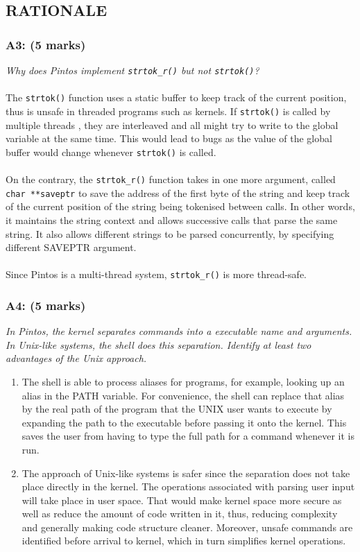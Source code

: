 \documentclass{article}
\begin{document}
\subsection{RATIONALE}

\subsubsection*{A3: (5 marks) }
\textit{Why does Pintos implement \texttt{strtok\_r()} but not \texttt{strtok()}?}
\\ \\
The \texttt{strtok()} function uses a static buffer to keep track of the current position, thus is unsafe in threaded programs such as kernels. If \texttt{strtok()} is called by multiple threads ,  they are interleaved and all might try to write to the global variable at the same time. This would lead to bugs as the value of the global buffer would change whenever \texttt{strtok()} is called.
\\ \\
On the contrary, the \texttt{strtok\_r()} function takes in one more argument, called \texttt{char **saveptr} to save the address of the first byte of the string and keep track of the current position of the string being tokenised between calls. In other words, it maintains the string context and allows successive calls that parse the same string. It also allows different strings to be parsed concurrently, by specifying different SAVEPTR argument.
\\ \\
Since Pintos is a multi-thread system, \texttt{strtok\_r()} is more thread-safe.



\subsubsection*{A4: (5 marks) }
\textit{In Pintos, the kernel separates commands into a executable name and
arguments. In Unix-like systems, the shell does this separation. Identify at
least two advantages of the Unix approach.}
\begin{enumerate}
  \item The shell is able to process aliases for programs, for example, looking up an alias in the PATH variable. For convenience, the shell can replace that alias by the real path of the program that the UNIX user wants to execute by expanding the path to the executable before passing it onto the kernel. This saves the user from having to type the full path for a command whenever it is run.

  \item The approach of Unix-like systems is safer since the separation does not take place directly in the kernel. The operations associated with parsing user input will take place in user space. That would make kernel space more secure as well as reduce the  amount of code written in it, thus, reducing complexity and generally making code structure cleaner. Moreover, unsafe commands are identified before arrival to kernel, which in turn simplifies kernel operations.
\end{enumerate}
\end{document}
